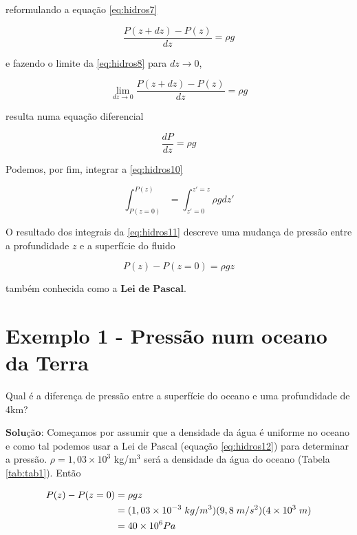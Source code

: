 \documentclass[
  portuguese,
  ]{book}
\begin{document}
reformulando a equação \eqref{eq:hidros7}

\begin{equation}
\frac{P(z+dz)-P(z)}{dz}=\rho g
\label{eq:hidros8}
\end{equation}

e fazendo o limite da \eqref{eq:hidros8} para \(dz\rightarrow 0\),

\begin{equation}
\lim_{dz\rightarrow 0}\frac{P(z+dz)-P(z)}{dz}=\rho g
\label{eq:hidros9}
\end{equation}

resulta numa equação diferencial

\begin{equation}
\frac{dP}{dz}=\rho g
\label{eq:hidros10}
\end{equation}

Podemos, por fim, integrar a \eqref{eq:hidros10}

\begin{equation}
\int^{P(z)}_{P(z=0)}=\int^{z'=z}_{z'=0}\rho g dz'
\label{eq:hidros11}
\end{equation}

O resultado dos integrais da \eqref{eq:hidros11} descreve uma mudança de pressão entre a profundidade \(z\) e a superfície do fluido

\begin{equation}
P(z)-P(z=0)=\rho gz
\label{eq:hidros12}
\end{equation}

também conhecida como a \(\textbf{Lei de Pascal}\).

\hypertarget{exemplo-1---pressuxe3o-num-oceano-da-terra}{%
\section{Exemplo 1 - Pressão num oceano da Terra}\label{exemplo-1---pressuxe3o-num-oceano-da-terra}}

Qual é a diferença de pressão entre a superfície do oceano e uma profundidade de 4km?

\(\textbf{Solução:}\) Começamos por assumir que a densidade da água é uniforme no oceano e como tal podemos usar a Lei de Pascal (equação \eqref{eq:hidros12}) para determinar a pressão. \(\rho=1,03\times10^3\) kg/m\(^{3}\) será a densidade da água do oceano (Tabela \ref{tab:tab1}). Então

\begin{equation}
\begin{aligned}
P(z)-P(z=0) &=\rho gz \\
& =(1,03\times10^{-3} \hspace{0.1cm}kg/m^3)(9,8 \hspace{0.1cm}m/s^2)(4\times 10^3\hspace{0.1cm} m)\\
& =40\times 10^6 Pa
\end{aligned}
\label{eq:hidros13}
\end{equation}
\end{document}
